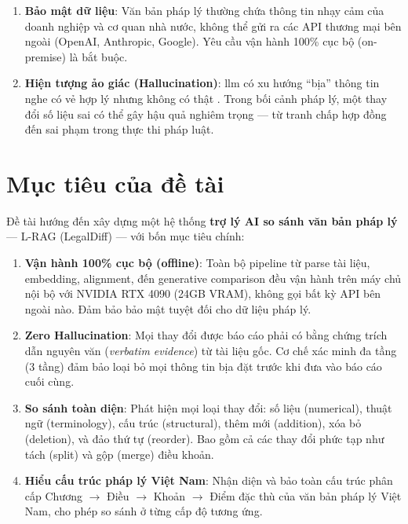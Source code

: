 \begin{enumerate}[label=(\arabic*)]
    \item \textbf{Bảo mật dữ liệu}: Văn bản pháp lý thường chứa thông tin nhạy cảm của doanh nghiệp và cơ quan nhà nước, không thể gửi ra các API thương mại bên ngoài (OpenAI, Anthropic, Google). Yêu cầu vận hành 100\% cục bộ (on-premise) là bắt buộc.
    \item \textbf{Hiện tượng ảo giác (Hallucination)}: \gls{llm} có xu hướng ``bịa'' thông tin nghe có vẻ hợp lý nhưng không có thật \cite{huang2025survey,ji2023survey}. Trong bối cảnh pháp lý, một thay đổi số liệu sai có thể gây hậu quả nghiêm trọng — từ tranh chấp hợp đồng đến sai phạm trong thực thi pháp luật.
\end{enumerate}

\section{Mục tiêu của đề tài}

Đề tài hướng đến xây dựng một hệ thống \textbf{trợ lý AI so sánh văn bản pháp lý} — L-RAG (LegalDiff) — với bốn mục tiêu chính:

\begin{enumerate}[label=(\arabic*)]
    \item \textbf{Vận hành 100\% cục bộ (offline)}: Toàn bộ pipeline từ parse tài liệu, embedding, alignment, đến generative comparison đều vận hành trên máy chủ nội bộ với NVIDIA RTX 4090 (24GB VRAM), không gọi bất kỳ API bên ngoài nào. Đảm bảo bảo mật tuyệt đối cho dữ liệu pháp lý.
    \item \textbf{Zero Hallucination}: Mọi thay đổi được báo cáo phải có bằng chứng trích dẫn nguyên văn (\textit{verbatim evidence}) từ tài liệu gốc. Cơ chế xác minh đa tầng (3 tầng) đảm bảo loại bỏ mọi thông tin bịa đặt trước khi đưa vào báo cáo cuối cùng.
    \item \textbf{So sánh toàn diện}: Phát hiện mọi loại thay đổi: số liệu (numerical), thuật ngữ (terminology), cấu trúc (structural), thêm mới (addition), xóa bỏ (deletion), và đảo thứ tự (reorder). Bao gồm cả các thay đổi phức tạp như tách (split) và gộp (merge) điều khoản.
    \item \textbf{Hiểu cấu trúc pháp lý Việt Nam}: Nhận diện và bảo toàn cấu trúc phân cấp Chương $\rightarrow$ Điều $\rightarrow$ Khoản $\rightarrow$ Điểm đặc thù của văn bản pháp lý Việt Nam, cho phép so sánh ở từng cấp độ tương ứng.
\end{enumerate}


